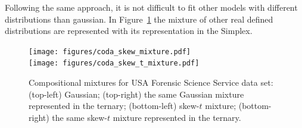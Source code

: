 \documentclass[10pt, a4paper]{article}
\begin{document}
Following the same approach, it is not difficult to fit other models with different distributions than gaussian. In Figure~\ref{othercodadist} the mixture of other real defined distributions are represented with its representation in the Simplex.

\begin{figure}[htbp]
\centering
\texttt{[image: figures/coda\_skew\_mixture.pdf]}\\%
\texttt{[image: figures/coda\_skew\_t\_mixture.pdf]}%
\caption{Compositional mixtures for USA Forensic Science Service data set: (top-left) Gaussian; (top-right) the same Gaussian mixture represented in the ternary; (bottom-left) skew-$t$ mixture; (bottom-right) the same skew-$t$ mixture represented in the ternary. }
\label{othercodadist}
\end{figure}


% 
% 
\end{document}
